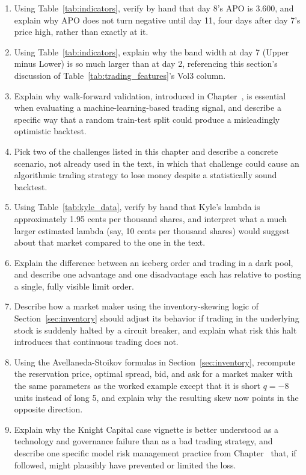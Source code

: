 \documentclass[../ai_in_finance]{subfiles}
\begin{document}
\begin{enumerate}[exercises]
    \item Using Table~\ref{tab:indicators}, verify by hand that day 8's APO is $3.600$, and explain why APO does not turn negative until day 11, four days after day 7's price high, rather than exactly at it.
    \item Using Table~\ref{tab:indicators}, explain why the band width at day 7 (Upper minus Lower) is so much larger than at day 2, referencing this section's discussion of Table~\ref{tab:trading_features}'s Vol3 column.
    \item Explain why walk-forward validation, introduced in Chapter~, is essential when evaluating a machine-learning-based trading signal, and describe a specific way that a random train-test split could produce a misleadingly optimistic backtest.
    \item Pick two of the challenges listed in this chapter and describe a concrete scenario, not already used in the text, in which that challenge could cause an algorithmic trading strategy to lose money despite a statistically sound backtest.
    \item Using Table~\ref{tab:kyle_data}, verify by hand that Kyle's lambda is approximately 1.95 cents per thousand shares, and interpret what a much larger estimated lambda (say, 10 cents per thousand shares) would suggest about that market compared to the one in the text.
    \item Explain the difference between an iceberg order and trading in a dark pool, and describe one advantage and one disadvantage each has relative to posting a single, fully visible limit order.
    \item Describe how a market maker using the inventory-skewing logic of Section~\ref{sec:inventory} should adjust its behavior if trading in the underlying stock is suddenly halted by a circuit breaker, and explain what risk this halt introduces that continuous trading does not.
    \item Using the Avellaneda-Stoikov formulas in Section~\ref{sec:inventory}, recompute the reservation price, optimal spread, bid, and ask for a market maker with the same parameters as the worked example except that it is short $q=-8$ units instead of long 5, and explain why the resulting skew now points in the opposite direction.
    \item Explain why the Knight Capital case vignette is better understood as a technology and governance failure than as a bad trading strategy, and describe one specific model risk management practice from Chapter~ that, if followed, might plausibly have prevented or limited the loss.

\end{enumerate}
\end{document}
